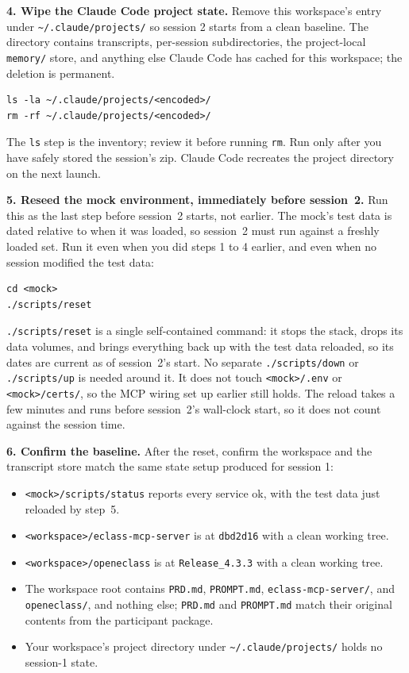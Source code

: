\documentclass[11pt, a4paper]{article}
\begin{document}
\textbf{4. Wipe the Claude Code project state.} Remove this workspace's entry under \texttt{\textasciitilde/.claude/projects/} so session 2 starts from a clean baseline. The directory contains transcripts, per-session subdirectories, the project-local \texttt{memory/} store, and anything else Claude Code has cached for this workspace; the deletion is permanent.

\begin{verbatim}
ls -la ~/.claude/projects/<encoded>/
rm -rf ~/.claude/projects/<encoded>/
\end{verbatim}

The \texttt{ls} step is the inventory; review it before running \texttt{rm}. Run only after you have safely stored the session's zip. Claude Code recreates the project directory on the next launch.

\textbf{5. Reseed the mock environment, immediately before session~2.} Run this as the last step before session~2 starts, not earlier. The mock's test data is dated relative to when it was loaded, so session~2 must run against a freshly loaded set. Run it even when you did steps 1 to 4 earlier, and even when no session modified the test data:

\begin{verbatim}
cd <mock>
./scripts/reset
\end{verbatim}

\texttt{./scripts/reset} is a single self-contained command: it stops the stack, drops its data volumes, and brings everything back up with the test data reloaded, so its dates are current as of session~2's start. No separate \texttt{./scripts/down} or \texttt{./scripts/up} is needed around it. It does not touch \texttt{<mock>/.env} or \texttt{<mock>/certs/}, so the MCP wiring set up earlier still holds. The reload takes a few minutes and runs before session~2's wall-clock start, so it does not count against the session time.

\textbf{6. Confirm the baseline.} After the reset, confirm the workspace and the transcript store match the same state setup produced for session 1:

\begin{itemize}
    \item \texttt{<mock>/scripts/status} reports every service ok, with the test data just reloaded by step~5.
    \item \texttt{<workspace>/eclass-mcp-server} is at \texttt{dbd2d16} with a clean working tree.
    \item \texttt{<workspace>/openeclass} is at \texttt{Release\_4.3.3} with a clean working tree.
    \item The workspace root contains \texttt{PRD.md}, \texttt{PROMPT.md}, \texttt{eclass-mcp-server/}, and \texttt{openeclass/}, and nothing else; \texttt{PRD.md} and \texttt{PROMPT.md} match their original contents from the participant package.
    \item Your workspace's project directory under \texttt{\textasciitilde/.claude/projects/} holds no session-1 state.
\end{itemize}
\end{document}

